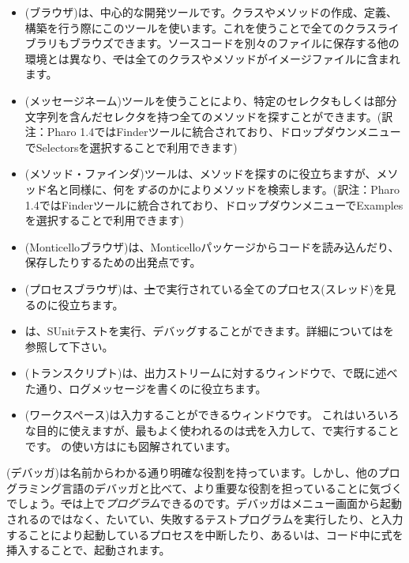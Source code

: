\documentclass[a4paper,10pt,twoside]{book}
\begin{document}
\begin{itemize}
\item{(ブラウザ)}は、中心的な開発ツールです。クラスやメソッドの作成、定義、構築を行う際にこのツールを使います。これを使うことで全てのクラスライブラリもブラウズできます。ソースコードを別々のファイルに保存する他の環境とは異なり、\st では全てのクラスやメソッドがイメージファイルに含まれます。

\item{(メッセージネーム)}ツールを使うことにより、特定のセレクタもしくは部分文字列を含んだセレクタを持つ全てのメソッドを探すことができます。(訳注：Pharo 1.4ではFinderツールに統合されており、ドロップダウンメニューでSelectorsを選択することで利用できます)

\item{(メソッド・ファインダ)}ツールは、メソッドを探すのに役立ちますが、メソッド名と同様に、何を\emph{する}のかによりメソッドを検索します。(訳注：Pharo 1.4ではFinderツールに統合されており、ドロップダウンメニューでExamplesを選択することで利用できます)

\item{(Monticelloブラウザ)}は、Monticelloパッケージからコードを読み込んだり、保存したりするための出発点です。

\item{(プロセスブラウザ)}は、\st 上で実行されている全てのプロセス(スレッド)を見るのに役立ちます。

\item{}は、SUnitテストを実行、デバッグすることができます。詳細についてはを参照して下さい。

\item{(トランスクリプト)}は、出力ストリームに対するウィンドウで、で既に述べた通り、ログメッセージを書くのに役立ちます。

\item{(ワークスペース)}は入力することができるウィンドウです。
          これはいろいろな目的に使えますが、最もよく使われるのは\st 式を入力して、で実行することです。
          の使い方はにも図解されています。
\end{itemize}

(デバッガ)は名前からわかる通り明確な役割を持っています。しかし、他のプログラミング言語のデバッガと比べて、より重要な役割を担っていることに気づくでしょう。\st では上で\emph{プログラム}できるのです。デバッガはメニュー画面から起動されるのではなく、たいてい、失敗するテストプログラムを実行したり、と入力することにより起動しているプロセスを中断したり、あるいは、コード中に式を挿入することで、起動されます。
\end{document}
